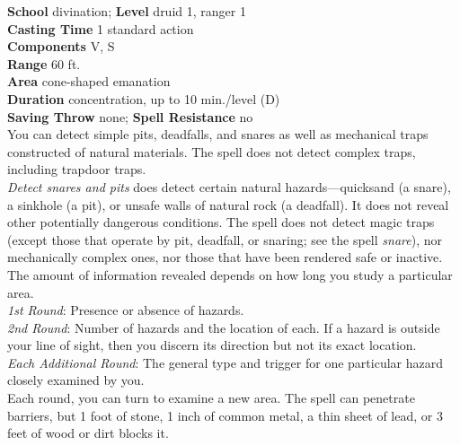 \textbf{School} divination; \textbf{Level} druid 1, ranger 1\\
\textbf{Casting Time} 1 standard action\\
\textbf{Components} V, S\\
\textbf{Range} 60 ft.\\
\textbf{Area} cone-shaped emanation\\
\textbf{Duration} concentration, up to 10 min./level (D)\\
\textbf{Saving Throw} none; \textbf{Spell Resistance} no\\
You can detect simple pits, deadfalls, and snares as well as mechanical traps constructed of natural materials. The spell does not detect complex traps, including trapdoor traps.\\
\textit{Detect snares and pits }does detect certain natural hazards—quicksand (a snare), a sinkhole (a pit), or unsafe walls of natural rock (a deadfall). It does not reveal other potentially dangerous conditions. The spell does not detect magic traps (except those that operate by pit, deadfall, or snaring; see the spell \textit{snare}), nor mechanically complex ones, nor those that have been rendered safe or inactive.\\
The amount of information revealed depends on how long you study a particular area.\\
\textit{1st Round}: Presence or absence of hazards.\\
\textit{2nd Round}: Number of hazards and the location of each. If a hazard is outside your line of sight, then you discern its direction but not its exact location.\\
\textit{Each Additional Round}: The general type and trigger for one particular hazard closely examined by you.\\
Each round, you can turn to examine a new area. The spell can penetrate barriers, but 1 foot of stone, 1 inch of common metal, a thin sheet of lead, or 3 feet of wood or dirt blocks it.\\
